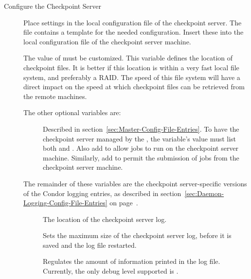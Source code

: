 \begin{description}

\item[Configure the Checkpoint Server]

Place settings in the local configuration file of
the checkpoint server.
The file  contains
a template for the needed configuration. Insert these into the local
configuration file of the checkpoint server machine. 

The value of   
must be customized.
This variable defines the location of checkpoint files.
It is better if this location is within a very fast local file system,
and preferably a RAID. 
The speed of this file system will have a direct impact on the speed
at which checkpoint files can be retrieved from the remote machines. 

The other optional variables are:
\begin{description}

\item[] Described in
section~\ref{sec:Master-Config-File-Entries}.  
To have the checkpoint server managed by the ,
the  variable's value must list both 
and .
Also add  to allow jobs to run on the checkpoint server machine.
Similarly, add  to permit the submission of jobs from the
checkpoint server machine. 

\end{description}

The remainder of these variables are the checkpoint server-specific versions
of the Condor logging entries, as described in
section~\ref{sec:Daemon-Logging-Config-File-Entries} on
page~\pageref{sec:Daemon-Logging-Config-File-Entries}.
\begin{description}

\item[] The location of the checkpoint server log.

\item[] Sets the maximum
size of the checkpoint server log, before it is saved and the
log file restarted.

\item[] Regulates the amount of information
printed in the log file.
Currently, the only debug level supported is .


\end{description}
\end{description}
